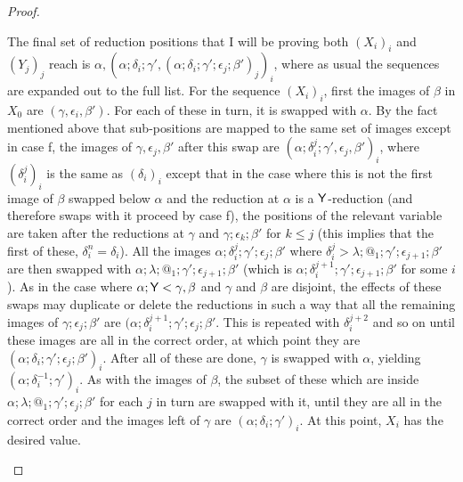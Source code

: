 \begin{proof}
\begin{itemize}
  The final set of reduction positions that I will be proving both $(X_i)_i$ and $(Y_j)_j$ reach is $\alpha, (\alpha;\delta_i;\gamma', (\alpha;\delta_i;\gamma';\epsilon_j;\beta')_j)_i$, where as usual the sequences are expanded out to the full list. For the sequence $(X_i)_i$, first the images of $\beta$ in $X_0$ are $(\gamma,\epsilon_i,\beta')$. For each of these in turn, it is swapped with $\alpha$. By the fact mentioned above that sub-positions are mapped to the same set of images except in case f, the images of $\gamma,\epsilon_j,\beta'$ after this swap are $(\alpha;\delta_i^j;\gamma',\epsilon_j,\beta')_i$, where $(\delta_i^j)_i$ is the same as $(\delta_i)_i$ except that in the case where this is not the first image of $\beta$ swapped below $\alpha$ and the reduction at $\alpha$ is a $\mathsf{Y}$-reduction (and therefore swaps with it proceed by case f), the positions of the relevant variable are taken after the reductions at $\gamma$ and $\gamma;\epsilon_k;\beta'$ for $k \leq j$ (this implies that the first of these, $\delta_i^n = \delta_i$). All the images $\alpha;\delta_i^j;\gamma';\epsilon_j;\beta'$ where $\delta_i^j > \lambda;@_1;\gamma';\epsilon_{j+1};\beta'$ are then swapped with $\alpha;\lambda;@_1;\gamma';\epsilon_{j+1};\beta'$ (which is $\alpha;\delta_i^{j+1};\gamma';\epsilon_{j+1};\beta'$ for some $i$). As in the case where $\alpha;\mathsf{Y} < \gamma, \beta$ and $\gamma$ and $\beta$ are disjoint, the effects of these swaps may duplicate or delete the reductions in such a way that all the remaining images of $\gamma;\epsilon_j;\beta'$ are $(\alpha;\delta_i^{j+1};\gamma';\epsilon_j;\beta'$. This is repeated with $\delta_i^{j+2}$ and so on until these images are all in the correct order, at which point they are $(\alpha;\delta_i;\gamma';\epsilon_j;\beta')_i$. After all of these are done, $\gamma$ is swapped with $\alpha$, yielding $(\alpha;\delta_i^{-1};\gamma')_i$. As with the images of $\beta$, the subset of these which are inside $\alpha;\lambda;@_1;\gamma';\epsilon_j;\beta'$ for each $j$ in turn are swapped with it, until they are all in the correct order and the images left of $\gamma$ are $(\alpha;\delta_i;\gamma')_i$. At this point, $X_i$ has the desired value.
  

\end{itemize}
\end{proof}
